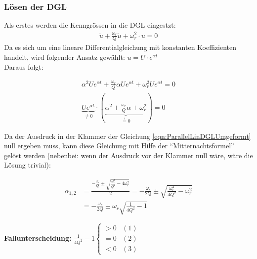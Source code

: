 \subsubsection{Lösen der DGL}
Als erstes werden die Kenngrössen in die DGL eingestzt:
\begin{align}
\boxed{\ddot{u} + \frac{\omega_r}{Q}\dot{u} + \omega_r^2 \cdot u = 0}
\end{align}
Da es sich um eine lineare Differentialgleichung mit konstanten Koeffizienten
handelt, wird folgender Ansatz gewählt: $u = U \cdot e^{\alpha t}$ \\
Daraus folgt: 

\begin{align}
\alpha^2 U e^{\alpha t} + \frac{\omega_r}{Q}\alpha U e^{\alpha t} + \omega_r^2 U
e^{\alpha t} = 0 \\
\underbrace{U e^{\alpha t}}_{\neq 0} \cdot (\underbrace{\alpha^2 +
\frac{\omega_r}{Q} \alpha + \omega_r^2}_{\overset{!}{=} 0}) = 0
\label{eqn:ParallelLinDGLUmgeformt}
\end{align}

Da der Ausdruck in der Klammer der Gleichung \ref{eqn:ParallelLinDGLUmgeformt}
null ergeben muss, kann diese Gleichung mit Hilfe der "`Mitternachtsformel"'
gelöst werden (nebenbei: wenn der Ausdruck vor der Klammer null wäre, wäre die
Lösung trivial):

\begin{align}
\alpha_{1,2} &= \frac{-\frac{\omega_r}{Q} \pm \sqrt{\frac{\omega_r^2}{Q^2} -
4\omega_r^2}}{2} = - \frac{\omega_r}{2Q} \pm \sqrt{\frac{\omega_r^2}{4Q^2} -
\omega_r^2} \\
 &= -\frac{\omega_r}{2Q} \pm \omega_r \sqrt{\frac{1}{4Q^2} -1}
\end{align}

\textbf{Fallunterscheidung:} 
$\frac{1}{4Q^2} -1 \begin{cases}
 > 0 & (1)\\
 = 0 & (2) \\
 < 0 & (3)
\end{cases}$

